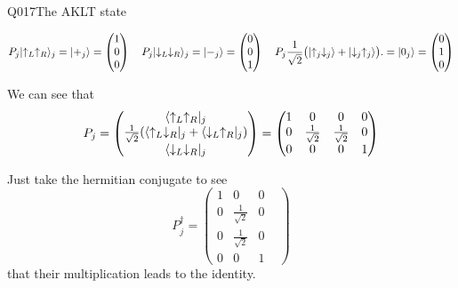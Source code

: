 \begin{entry}{Q017}{The AKLT state}
\begin{solution}[Part (c)]
\begin{equation}
    P_j\lvert \uparrow_L\uparrow_R \rangle_j = \lvert +_j \rangle = \begin{pmatrix}
        1\\
        0\\
        0
    \end{pmatrix}\quad P_j \lvert \downarrow_L\downarrow_R \rangle_j = \lvert -_j \rangle = \begin{pmatrix}
        0\\
        0\\
        1
    \end{pmatrix} \quad P_j\frac{1}{\sqrt2}\bigl(\lvert \uparrow_j\downarrow_j \rangle
            +\lvert \downarrow_j\uparrow_j \rangle\bigr). = \lvert 0_j \rangle = \begin{pmatrix}
        0\\
        1\\
        0
    \end{pmatrix}
\end{equation}
\end{solution}

\begin{solution}[Part (d)]
We can see that
\begin{equation}
    P_j = \begin{pmatrix}
    \langle \uparrow_L\uparrow_R \rvert_j\\
    \frac{1}{\sqrt{2}}(\langle \uparrow_L\downarrow_R \rvert_j+\langle \downarrow_L\uparrow_R \rvert_j)\\
    \langle \downarrow_L\downarrow_R \rvert_j
    \end{pmatrix}= \begin{pmatrix}
    1 & 0 & 0 &0\\
    0 & \frac{1}{\sqrt{2}} & \frac{1}{\sqrt{2}} &0\\
    0 & 0 & 0 &1
    \end{pmatrix}
\end{equation}


Just take the hermitian conjugate to see
\begin{equation}
    P_j^\dagger= \begin{pmatrix}
    1 & 0 & 0 &\\
    0 & \frac{1}{\sqrt{2}} & 0 \\
    0 & \frac{1}{\sqrt{2}} & 0 & \\
    0 & 0  & 1
    \end{pmatrix}
\end{equation}
that their multiplication leads to the identity.


\end{solution}
\end{entry}
